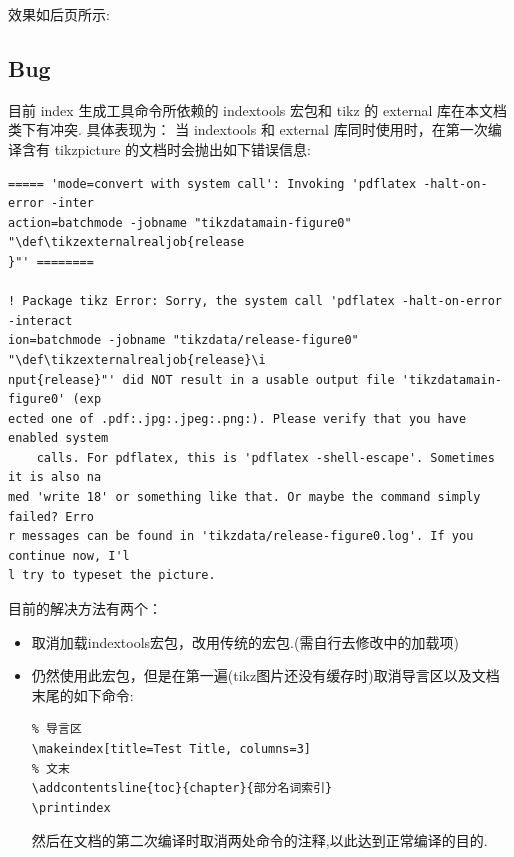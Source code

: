 效果如后页所示:%



\subsection{Bug}
目前 index 生成工具命令所依赖的 indextools 宏包和 tikz 的 external 库在本文档类下有冲突. 具体表现为：
当 {indextools} 和 {external} 库同时使用时，在第一次编译含有 tikzpicture 的文档时会抛出如下错误信息:

\begin{verbatim}
===== 'mode=convert with system call': Invoking 'pdflatex -halt-on-error -inter
action=batchmode -jobname "tikzdatamain-figure0" "\def\tikzexternalrealjob{release
}"' ========

! Package tikz Error: Sorry, the system call 'pdflatex -halt-on-error -interact
ion=batchmode -jobname "tikzdata/release-figure0" "\def\tikzexternalrealjob{release}\i
nput{release}"' did NOT result in a usable output file 'tikzdatamain-figure0' (exp
ected one of .pdf:.jpg:.jpeg:.png:). Please verify that you have enabled system
    calls. For pdflatex, this is 'pdflatex -shell-escape'. Sometimes it is also na
med 'write 18' or something like that. Or maybe the command simply failed? Erro
r messages can be found in 'tikzdata/release-figure0.log'. If you continue now, I'l
l try to typeset the picture.
\end{verbatim}


目前的解决方法有两个：
\begin{itemize}
    \item 取消加载indextools宏包，改用传统的宏包.(需自行去修改中的加载项)
    \item 仍然使用此宏包，但是在第一遍(tikz图片还没有缓存时)取消导言区以及文档末尾的如下命令:
  \begin{verbatim}
% 导言区
\makeindex[title=Test Title, columns=3]
% 文末
\addcontentsline{toc}{chapter}{部分名词索引}
\printindex
  \end{verbatim}
  然后在文档的第二次编译时取消两处命令的注释,以此达到正常编译的目的.
\end{itemize}
